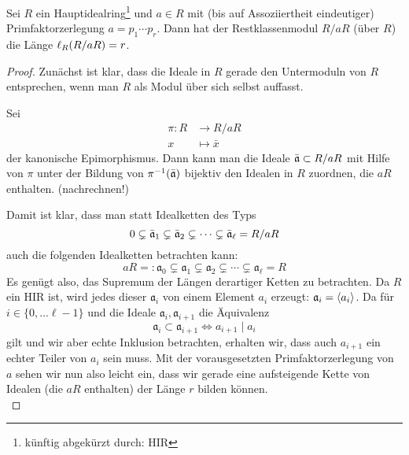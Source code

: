 \begin{thLemma}%
    Sei $R$ ein Hauptidealring\footnote{künftig abgekürzt durch: HIR} und $a\in
    R$ mit (bis auf Assoziiertheit eindeutiger) Primfaktorzerlegung 
    $a = p_1\cdots p_r$.
    Dann hat der Restklassenmodul $R/aR$ (über $R$) die Länge $\operatorname{\ell}_{R}(R/aR) = r$.
\end{thLemma}
\begin{proof}
    Zunächst ist klar, dass die Ideale in $R$ gerade den Untermoduln von $R$
    entsprechen, wenn man $R$ als Modul über sich selbst auffasst.

    Sei 
    \begin{align*}
        \pi\colon R &\to R/aR   \\
                  x &\mapsto \bar x
    \end{align*}
    der kanonische Epimorphismus. Dann kann man die Ideale $\bar{\mathfrak{a}} \subset
    R/aR$ mit Hilfe von $\pi$ unter der Bildung von $\pi^{-1}(\bar{\mathfrak{a}})$
    bijektiv den Idealen in $R$ zuordnen, die $aR$ enthalten. (nachrechnen!)
    
    Damit ist klar, dass man statt Idealketten des Typs
    \[ 0 \subsetneq \bar{\mathfrak{a}}_1 \subsetneq \bar{\mathfrak{a}}_2 \subsetneq 
        \cdots \subsetneq \bar{\mathfrak{a}}_\ell = R/aR      \]
    auch die folgenden Idealketten betrachten kann:
    \[ aR =: \mathfrak{a}_0 \subsetneq \mathfrak{a}_1 
                \subsetneq \mathfrak{a}_2 \subsetneq 
                \cdots \subsetneq \mathfrak{a}_\ell = R        \]
    Es genügt also, das Supremum der Längen derartiger Ketten zu betrachten. Da
    $R$ ein HIR ist, wird jedes dieser $\mathfrak{a}_i$ von einem Element $a_i$
    erzeugt: $\mathfrak{a}_i = \langle a_i\rangle$. Da für $i\in\{0,\ldots \ell-1\}$ und
    die Ideale $\mathfrak{a}_i,\mathfrak{a}_{i+1}$ die Äquivalenz
    \[ \mathfrak{a}_i \subset \mathfrak{a}_{i+1} \iff a_{i+1} \mid a_i \]
    gilt und wir aber echte Inklusion betrachten, erhalten wir, dass auch
    $a_{i+1}$ ein echter Teiler von $a_i$ sein muss. Mit der vorausgesetzten
    Primfaktorzerlegung von $a$ sehen wir nun also leicht ein, dass wir gerade
    eine aufsteigende Kette von Idealen (die $aR$ enthalten) der Länge $r$
    bilden können.
    \\
\end{proof}

